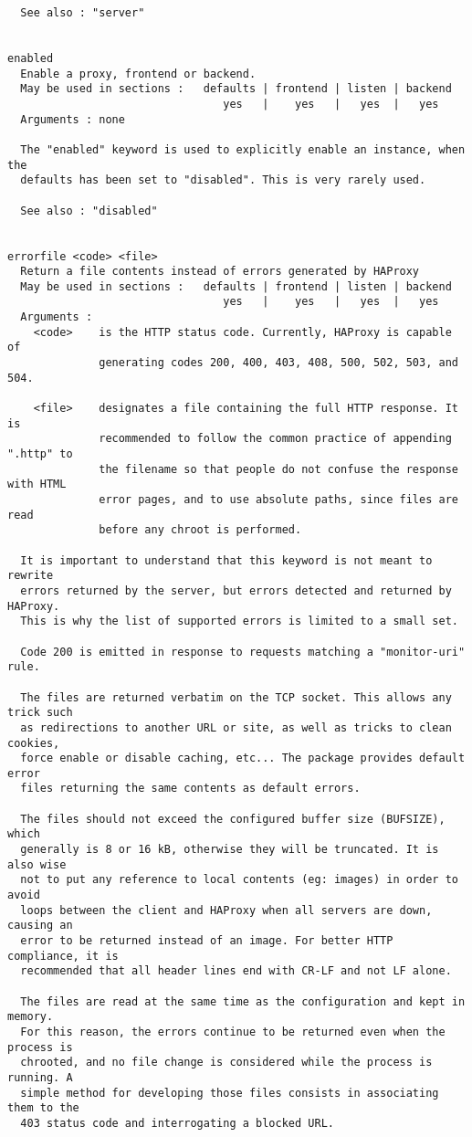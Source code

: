 \begin{verbatim}
  See also : "server"


enabled
  Enable a proxy, frontend or backend.
  May be used in sections :   defaults | frontend | listen | backend
                                 yes   |    yes   |   yes  |   yes
  Arguments : none

  The "enabled" keyword is used to explicitly enable an instance, when the
  defaults has been set to "disabled". This is very rarely used.

  See also : "disabled"


errorfile <code> <file>
  Return a file contents instead of errors generated by HAProxy
  May be used in sections :   defaults | frontend | listen | backend
                                 yes   |    yes   |   yes  |   yes
  Arguments :
    <code>    is the HTTP status code. Currently, HAProxy is capable of
              generating codes 200, 400, 403, 408, 500, 502, 503, and 504.

    <file>    designates a file containing the full HTTP response. It is
              recommended to follow the common practice of appending ".http" to
              the filename so that people do not confuse the response with HTML
              error pages, and to use absolute paths, since files are read
              before any chroot is performed.

  It is important to understand that this keyword is not meant to rewrite
  errors returned by the server, but errors detected and returned by HAProxy.
  This is why the list of supported errors is limited to a small set.

  Code 200 is emitted in response to requests matching a "monitor-uri" rule.

  The files are returned verbatim on the TCP socket. This allows any trick such
  as redirections to another URL or site, as well as tricks to clean cookies,
  force enable or disable caching, etc... The package provides default error
  files returning the same contents as default errors.

  The files should not exceed the configured buffer size (BUFSIZE), which
  generally is 8 or 16 kB, otherwise they will be truncated. It is also wise
  not to put any reference to local contents (eg: images) in order to avoid
  loops between the client and HAProxy when all servers are down, causing an
  error to be returned instead of an image. For better HTTP compliance, it is
  recommended that all header lines end with CR-LF and not LF alone.

  The files are read at the same time as the configuration and kept in memory.
  For this reason, the errors continue to be returned even when the process is
  chrooted, and no file change is considered while the process is running. A
  simple method for developing those files consists in associating them to the
  403 status code and interrogating a blocked URL.


\end{verbatim}
